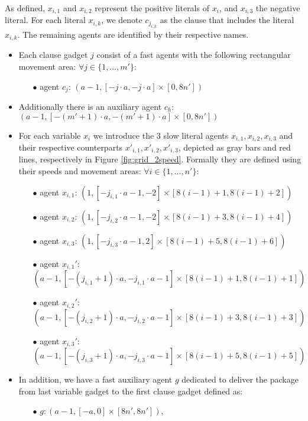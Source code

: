 As defined, $x_{i, 1}$ and $x_{i, 2}$ represent the positive literals of $x_i$, and $x_{i, 3}$ the negative literal. For each literal $x_{i, k}$, we denote $c_{j_{i, k}}$ as the clause that includes the literal $x_{i, k}$. The remaining agents are identified by their respective names.

\begin{itemize}
\item 
Each clause gadget $j$ consist of a fast agents with the following rectangular movement area:  $\forall j \in \{1, \dots, m'\}: $ 

\begin{itemize}
    \item[$\bullet$] agent $c_j$:  $(a-1, [-j\cdot a, -j\cdot a] \times [0, 8n'])$
\end{itemize}
\item Additionally there is an auxiliary agent $c_h$: $(a-1, [-(m'+1)\cdot a, -(m'+1)\cdot a] \times [0, 8n'])$

\item  %
For each variable $x_i$ we introduce the $3$ slow literal agents $x_{i, 1}, x_{i, 2}, x_{i, 3}$ and their respective counterparts $x'_{i,1},x'_{i, 2}, x'_{i, 3}$, depicted as gray bars and red lines, respectively in Figure \ref{fig:grid_2speed}. Formally they are defined using their speeds and movement areas:  
$\forall i \in \{1, \dots, n'\}: $ 
\begin{itemize}
    \item[$\bullet$] agent $ x_{i, 1}$:  $(1, [-j_{i, 1}\cdot a-1, -2] \times [8(i-1) + 1, 8(i-1) + 2])$
   \item[$\bullet$] agent $ x_{i, 2} $:  $ (1, [-j_{i, 2}\cdot a-1, -2]  \times [8(i-1) + 3, 8(i-1) + 4] )$
\item[$\bullet$] agent $ x_{i, 3} $:  $  (1, [-j_{i, 3}\cdot a-1, 2] \times [8(i-1) + 5, 8(i-1) + 6] )$
   \item[$\bullet$] agent $ x_{i, 1}'  $:  $ (a-1, [-(j_{i, 1}+1)\cdot a, -j_{i, 1}\cdot a-1]  \times [8(i-1) + 1, 8(i-1) + 1])$
  \item[$\bullet$] agent $ x_{i, 2}' $:  $ (a-1, [-(j_{i, 2}+1)\cdot a, -j_{i, 2}\cdot a-1] \times [8(i-1) + 3, 8(i-1) + 3]) $
 \item[$\bullet$] agent $ x_{i, 3}' $:  $(a-1, [-(j_{i, 3}+1)\cdot a, -j_{i, 3}\cdot a-1]  \times [8(i-1) + 5, 8(i-1) + 5]) $
\end{itemize}

\item In addition, we have a fast auxiliary agent $g$ dedicated to deliver the package from last variable gadget to the first clause gadget defined as: 
\begin{itemize}
    \item[$\bullet$] $ g:  (a-1, [-a, 0] \times [8n', 8n'])$,
\end{itemize}
\end{itemize}

